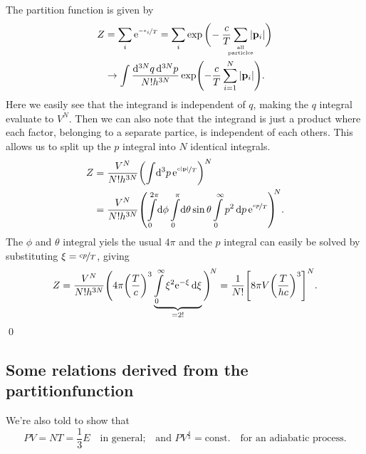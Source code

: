 \documentclass[11pt,letter, swedish, english
]{article}
\begin{document}
The partition function is given by
\begin{equation}
\begin{aligned}
Z&=\sum_i\ee^{\nicefrac{-\epsilon_i}{T}}
=\sum_i\exp\bigg(\!-\frac{c}{T}
\hspace{-5pt}\sum_{\stackrel{\text{\tiny all}}{\text{\tiny particles}}}\hspace{-5pt}
|\vb{p}_i|\bigg)\\
&\to \int\frac{\dd[3N]{q}\dd[3N]{p}}{N!h^{3N}}
\exp(-\frac{c}{T}\sum_{i=1}^N \abs{\vb{p}_i}).%
\end{aligned}
\end{equation}
Here we easily see that the integrand is independent of $q$, making
the $q$ integral evaluate to $V^N$. Then we can also note that the
integrand is just a product where each factor, belonging to a separate
partice, is independent of each others. This allows us to split up the
$p$ integral into $N$ identical integrals.
\begin{equation}
\begin{aligned}
Z&=\frac{V^N}{N!h^{3N}}
\qty(\int\!\dd[3]{p} \ee^{\nicefrac{c|\vb{p}|}{T}})^N\\
&=\frac{V^N}{N!h^{3N}}
\qty(\int_0^{2\pi}\!\dd{\phi}\int_0^\pi\!\dd{\theta}\sin\theta
\int_0^\infty p^2\dd{p}\ee^{\nicefrac{cp}{T}})^{\!\!N}.
\end{aligned}
\end{equation}
The $\phi$ and $\theta$ integral yiels the usual $4\pi$ and the $p$
integral can easily be solved by substituting $\xi=\nicefrac{cp}{T}$,
giving
\begin{equation}
Z=\frac{V^N}{N!h^{3N}}
\Bigg(4\pi \qty(\frac{T}{c})^3
\underbrace{\int_0^\infty \xi^2\ee^{-\xi}\id\xi}_{=2!}\Bigg)^{\!N}
=\frac{1}{N!} \qty[8\pi V \qty(\frac{T}{hc})^3]^N.
\end{equation}
\qed

\subsection*{Some relations derived from the partitionfunction}
We're also told to show that
\begin{equation}
PV=NT=\frac{1}{3}E \quad\text{in general;}
\quad\text{and } PV^{\frac{4}{3}}=\text{const.}
\quad\text{for an adiabatic process.}
\end{equation}
\end{document}
